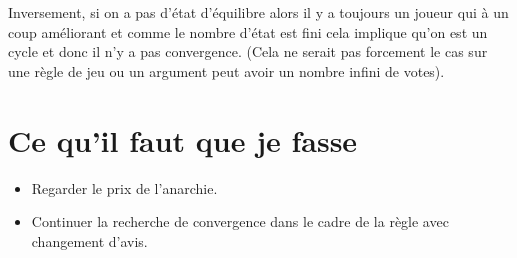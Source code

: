 \documentclass[12pt]{article}
\theoremstyle{defi}
\theoremstyle{not}
\theoremstyle{prob}
\begin{document}
    Inversement, si on a pas d'état d'équilibre alors il y a toujours un joueur qui à un coup améliorant et comme le nombre d'état est fini cela implique qu'on est un cycle et donc il n'y a pas convergence.
    (Cela ne serait pas forcement le cas sur une règle de jeu ou un argument peut avoir un nombre infini de votes).

  \color{black}
  \section{Ce qu'il faut que je fasse}

    \begin{itemize}
      \item Regarder le prix de l'anarchie.
      \color{blue}
      \item Continuer la recherche de convergence dans le cadre de la règle avec changement d'avis.
    \end{itemize}
\end{document}
